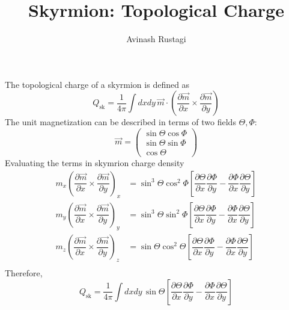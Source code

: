 \documentclass[aps,prb,onecolumn,notitlepage,showpacs,floatfix,superscriptaddress]{revtex4-1}
\newcommand{\mrm}[1]{\mathrm{#1}}
\begin{document}
\title{Skyrmion: Topological Charge}

\author{Avinash Rustagi}
%

\maketitle
%
The topological charge of a skyrmion is defined as
\begin{equation}
Q_\mrm{sk} =\dfrac{1}{4\pi}\int dxdy\, \vec{m} \cdot \left( \dfrac{\partial \vec{m}}{\partial x} \times \dfrac{\partial \vec{m}}{\partial y} \right)
\end{equation}
The unit magnetization can be described in terms of two fields $\Theta,\Phi$:
\begin{equation}
\vec{m} = \left( \begin{array}{c}
\sin\Theta \cos\Phi \\ 
\sin\Theta \sin\Phi \\ 
\cos\Theta
\end{array} \right)
\end{equation}
Evaluating the terms in skymrion charge density
\begin{equation}
\begin{split}
m_x \left( \dfrac{\partial \vec{m}}{\partial x} \times \dfrac{\partial \vec{m}}{\partial y} \right)_x &= \sin^3\Theta \cos^2\Phi \left[ \dfrac{\partial \Theta}{\partial x}\dfrac{\partial \Phi}{\partial y}-\dfrac{\partial \Phi}{\partial x}\dfrac{\partial \Theta}{\partial y} \right] \\
m_y \left( \dfrac{\partial \vec{m}}{\partial x} \times \dfrac{\partial \vec{m}}{\partial y} \right)_y &= \sin^3\Theta \sin^2\Phi \left[ \dfrac{\partial \Theta}{\partial x}\dfrac{\partial \Phi}{\partial y}-\dfrac{\partial \Phi}{\partial x}\dfrac{\partial \Theta}{\partial y} \right] \\
m_z \left( \dfrac{\partial \vec{m}}{\partial x} \times \dfrac{\partial \vec{m}}{\partial y} \right)_z &= \sin\Theta \cos^2\Theta \left[ \dfrac{\partial \Theta}{\partial x}\dfrac{\partial \Phi}{\partial y}-\dfrac{\partial \Phi}{\partial x}\dfrac{\partial \Theta}{\partial y} \right] \\
\end{split}
\end{equation}
Therefore,
\begin{equation}
Q_\mrm{sk} =\dfrac{1}{4\pi}\int dxdy\, \sin\Theta \left[ \dfrac{\partial \Theta}{\partial x}\dfrac{\partial \Phi}{\partial y}-\dfrac{\partial \Phi}{\partial x}\dfrac{\partial \Theta}{\partial y} \right]
\end{equation}
\end{document}
